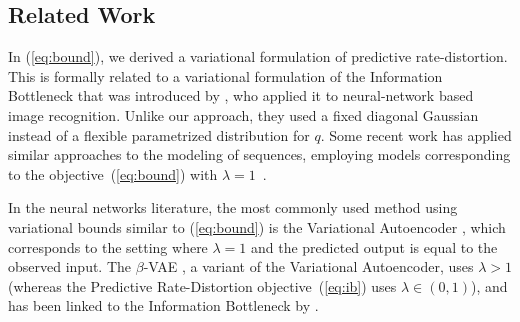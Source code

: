 \documentclass[entropy,article,submit,moreauthors,pdftex,10pt,a4paper]{Definitions/mdpi}
\newcommand{\finitepast}{\stackrel{\scriptscriptstyle{M}\leftarrow}{X}}%
\let\oldequation\equation
\let\oldendequation\endequation
\renewenvironment{equation}
  {\linenomathNonumbers\oldequation}
  {\oldendequation\endlinenomath}
\begin{document}






\subsection{Related Work}
In (\ref{eq:bound}), we derived a variational formulation of predictive rate-distortion.
This is formally related to a variational formulation of the Information Bottleneck that was introduced by \cite{alemi-deep-2016}, who applied it to neural-network based image recognition.
Unlike our approach, they used a fixed diagonal Gaussian instead of a flexible parametrized distribution for $q$.
Some recent work has applied similar approaches to the modeling of sequences, employing models corresponding to the objective~(\ref{eq:bound}) with $\lambda=1$~\citep{grathwohl2016disentangling,walker2016uncertain,fraccaro2017disentangled,hernandez2018variational}.



In the neural networks literature, the most commonly used method using variational bounds similar to (\ref{eq:bound}) is the Variational Autoencoder \citep{kingma-auto-encoding-2014, bowman-generating-2016}, which corresponds to the setting where $\lambda=1$ and the predicted output is equal to the observed input.
The $\beta$-VAE \citep{higgins2017beta}, a variant of the Variational Autoencoder, uses $\lambda > 1$ (whereas the Predictive Rate-Distortion objective~(\ref{eq:ib}) uses $\lambda \in (0,1)$), and has been linked to the Information Bottleneck by \cite{burgess2018understanding}.



\end{document}
